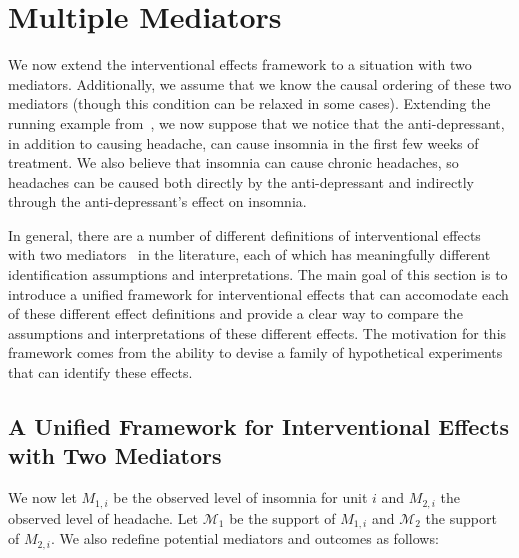
\section{Multiple Mediators}

We now extend the interventional effects framework to a situation with two mediators. Additionally, we 
assume that we know the causal ordering of these two mediators (though this condition can be relaxed in 
some cases). Extending the running example from~\cite{morenobetancur2018}, we now suppose that we notice 
that the anti-depressant, in addition to causing headache, can cause insomnia in the first few weeks of
treatment. We also believe that insomnia can cause chronic headaches, so headaches can be caused both 
directly by the anti-depressant and indirectly through the anti-depressant's effect on insomnia. 

In general, there are a number of different definitions of interventional effects with
two mediators~\citep{vanderweeleetal2014,vansteelandtdaniel2017,linvanderweele2017,jacksonvanderweele2018}
in the literature, each of which has meaningfully different identification assumptions and interpretations.
The main goal of this section is to introduce a unified framework for interventional effects that can 
accomodate each of these different effect definitions and provide a clear way to compare the assumptions 
and interpretations of these different effects. The motivation for this framework comes from the ability to 
devise a family of hypothetical experiments that can identify these effects. 

\subsection{A Unified Framework for Interventional Effects with Two Mediators}

We now let $M_{1,i}$ be the observed level of insomnia for unit $i$ and $M_{2,i}$ the observed level of
headache. Let $\mathcal{M}_{1}$ be the support of $M_{1,i}$ and $\mathcal{M}_{2}$ the support of $M_{2,i}$. 
We also redefine potential mediators and outcomes as follows:

